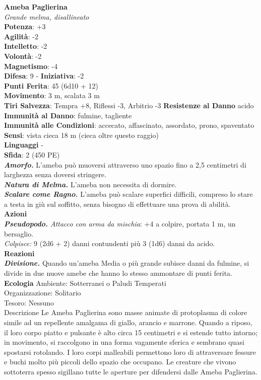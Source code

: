 \begin{multicols}{2}
\medskip\textbf{Ameba Paglierina}\\
\emph{Grande melma, disallineato}\\
\textbf{Potenza}: +3\\
\textbf{Agilità}: -2\\
\textbf{Intelletto}: -2\\
\textbf{Volontà}: -2\\
\textbf{Magnetismo}: -4\\
\textbf{Difesa}: 9 - \textbf{Iniziativa}: -2\\
\textbf{Punti Ferita}: 45 (6d10 + 12)\\
\textbf{Movimento}: 3 m, scalata 3 m\\
\textbf{Tiri Salvezza}: Tempra +8, Riflessi -3, Arbitrio -3
\textbf{Resistenze al Danno} acido\\
\textbf{Immunità al Danno}: fulmine, tagliente\\
\textbf{Immunità alle Condizioni}: accecato, affascinato, assordato, prono, spaventato\\
\textbf{Sensi}: vista cieca 18 m (cieca oltre questo raggio)\\
\textbf{Linguaggi} -\\
\textbf{Sfida}: 2 (450 PE)\smallskip\\
\emph{\textbf{Amorfo.}} L'ameba può muoversi attraverso uno spazio fino a 2,5 centimetri di larghezza senza doversi stringere.\\
\emph{\textbf{Natura di Melma.}} L'ameba non necessita di dormire.\\
\emph{\textbf{Scalare come Ragno.}} L'ameba può scalare superfici difficili, compreso lo stare a testa in giù sul soffitto, senza bisogno di effettuare una prova di abilità.\\
\smallskip\textbf{Azioni}\\
\emph{\textbf{Pseudopodo.} Attacco con arma da mischia}: +4 a colpire, portata 1 m, un bersaglio.\\
\emph{Colpisce:} 9 (2d6 + 2) danni contundenti più 3 (1d6) danni da acido.\\
\textbf{Reazioni}\\
\emph{\textbf{Divisione.}} Quando un'ameba Media o più grande subisce
danni da fulmine, si divide in due nuove amebe che hanno lo stesso ammontare di punti ferita.\\
\textbf{Ecologia}
Ambiente: Sotterranei o Paludi Temperati\\
Organizzazione: Solitario\\
Tesoro: Nessuno\\
Descrizione
Le Ameba Paglierina sono masse animate di protoplasma di colore simile ad un repellente amalgama di giallo, arancio e marrone. Quando a riposo, il loro corpo piatto e pulsante è alto circa 15 centimetri e si estende tutto intorno; in movimento, si raccolgono in una forma vagamente sferica e sembrano quasi spostarsi rotolando. I loro corpi malleabili permettono loro di attraversare fessure e buchi molto più piccoli dello spazio che occupano. Le creature che vivono sottoterra spesso sigillano tutte le aperture per difendersi dalle Ameba Paglierina.\\


\end{multicols}
